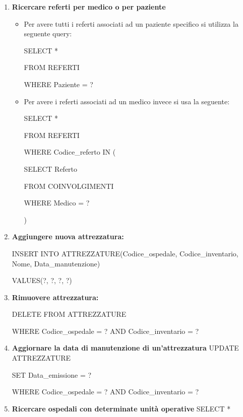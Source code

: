 \documentclass[a4paper,12pt]{report}
\begin{document}
\begin{enumerate}[leftmargin=0cm,itemindent=.5cm,labelwidth=\itemindent,labelsep=0cm,align=left]
    \item \textbf{Ricercare referti per medico o per paziente}
    \begin{itemize}
        \item Per avere tutti i referti associati ad un paziente specifico si utilizza la seguente query:
        
        SELECT *
        
        FROM REFERTI
        
        WHERE Paziente = ?

        \item Per avere i referti associati ad un medico invece si usa la seguente:
        
        SELECT *
       
        FROM REFERTI
       
        WHERE Codice\_referto IN (

            SELECT Referto
            
            FROM COINVOLGIMENTI
            
            WHERE Medico = ?
            
            )
    \end{itemize}
    
    \item \textbf{Aggiungere nuova attrezzatura:} \newline
    
    INSERT INTO ATTREZZATURE(Codice\_ospedale, Codice\_inventario, Nome, Data\_manutenzione)
    
    VALUES(?, ?, ?, ?)

    \item \textbf{Rimuovere attrezzatura:} \newline
    
    DELETE FROM ATTREZZATURE

    WHERE Codice\_ospedale = ? AND Codice\_inventario = ?

    \item \textbf{Aggiornare la data di manutenzione di un'attrezzatura} \newline
    UPDATE ATTREZZATURE
    
    SET Data\_emissione = ?
    
    WHERE Codice\_ospedale = ? AND Codice\_inventario = ?

    \item \textbf{Ricercare ospedali con determinate unità operative} \newline
    SELECT *


\end{enumerate}
\end{document}
